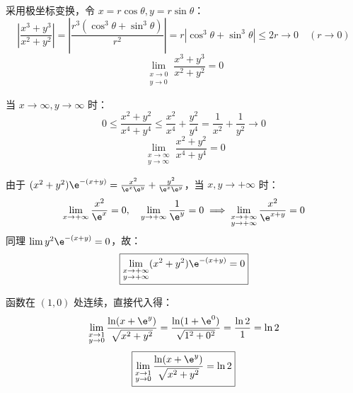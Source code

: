 \begin{solution}
    采用极坐标变换，令 $x = r \cos \theta, y = r \sin \theta$：
    \begin{equation*}
        \left| \frac{x^3 + y^3}{x^2 + y^2} \right| = \left| \frac{r^3(\cos^3 \theta + \sin^3 \theta)}{r^2} \right| = r |\cos^3 \theta + \sin^3 \theta| \le 2r \to 0 \quad (r \to 0)
    \end{equation*}
    \begin{equation*}
        \boxed{\lim_{\substack{x \to 0 \\ y \to 0}} \frac{x^3 + y^3}{x^2 + y^2} = 0}
    \end{equation*}

    当 $x \to \infty, y \to \infty$ 时：
    \begin{equation*}
        0 \le \frac{x^2 + y^2}{x^4 + y^4} \le \frac{x^2}{x^4} + \frac{y^2}{y^4} = \frac{1}{x^2} + \frac{1}{y^2} \to 0
    \end{equation*}
    \begin{equation*}
        \boxed{\lim_{\substack{x \to \infty \\ y \to \infty}} \frac{x^2 + y^2}{x^4 + y^4} = 0}
    \end{equation*}

    由于 $(x^2 + y^2) \e^{-(x+y)} = \frac{x^2}{\e^x \e^y} + \frac{y^2}{\e^x \e^y}$，当 $x, y \to +\infty$ 时：
    \begin{equation*}
        \lim_{x \to +\infty} \frac{x^2}{\e^x} = 0, \quad \lim_{y \to +\infty} \frac{1}{\e^y} = 0 \implies \lim_{\substack{x \to +\infty \\ y \to +\infty}} \frac{x^2}{\e^{x+y}} = 0
    \end{equation*}
    同理 $\lim y^2 \e^{-(x+y)} = 0$，故：
    \begin{equation*}
        \boxed{\lim_{\substack{x \to +\infty \\ y \to +\infty}} (x^2 + y^2) \e^{-(x+y)} = 0}
    \end{equation*}

    函数在 $(1, 0)$ 处连续，直接代入得：
    \begin{equation*}
        \lim_{\substack{x \to 1 \\ y \to 0}} \frac{\ln (x + \e^y)}{\sqrt{x^2 + y^2}} = \frac{\ln(1 + \e^0)}{\sqrt{1^2 + 0^2}} = \frac{\ln 2}{1} = \ln 2
    \end{equation*}
    \begin{equation*}
        \boxed{\lim_{\substack{x \to 1 \\ y \to 0}} \frac{\ln (x + \e^y)}{\sqrt{x^2 + y^2}} = \ln 2}
    \end{equation*}


\end{solution}
